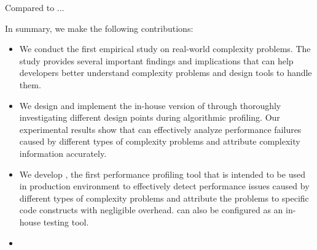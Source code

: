 Compared to ... 


In summary, we make the following contributions:

\begin{itemize}

\item We conduct the first empirical study on real-world complexity problems.
The study provides several important findings and implications that can
help developers better understand complexity problems and design tools
to handle them. 


\item We design and implement the in-house version of \Tool through
thoroughly investigating different design points during algorithmic profiling.
Our experimental results show that \Tool can effectively analyze performance failures
caused by different types of complexity problems and attribute complexity information accurately.

\fi

\item We develop   \Tool, the first performance profiling tool that is intended to be used
in production environment to effectively detect performance
issues caused by different types of complexity problems and attribute the 
problems to specific code constructs with negligible
overhead.  
\Tool can also be configured as an in-house testing tool. 

\item {}




\end{itemize}
